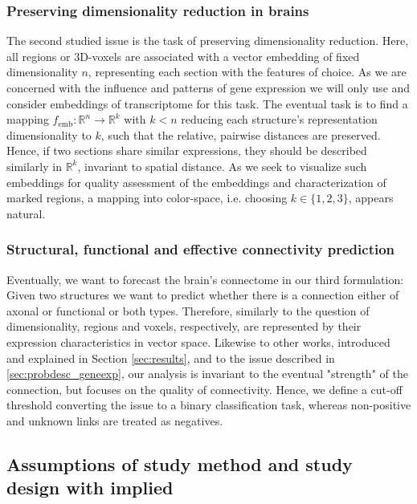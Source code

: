 \documentclass[]{article}
\begin{document}
\subsubsection{Preserving dimensionality reduction in brains}
\label{sec:probdesc_dimpres}
The second studied issue is the task of preserving dimensionality reduction. Here, all regions or 3D-voxels are associated with a vector embedding of fixed dimensionality $n$, representing each section with the features of choice. As we are concerned with the influence and patterns of gene expression we will only use and consider embeddings of transcriptome for this task. The eventual task is to find a mapping $f_{\text{emb}}:\mathbb{R}^n \rightarrow \mathbb{R}^k$ with $k<n$ reducing each structure's representation dimensionality to $k$, such that the relative, pairwise distances are preserved. Hence, if two sections share similar expressions, they should be described similarly in $\mathbb{R}^k$, invariant to spatial distance. As we seek to visualize such embeddings for quality assessment of the embeddings and characterization of marked regions, a mapping into color-space, i.e. choosing $k\in\{1,2,3\}$, appears natural.

\subsubsection{Structural, functional and effective connectivity prediction}
\label{sec:probdesc_connpred}
Eventually, we want to forecast the brain's connectome in our third formulation: Given two structures we want to predict whether there is a connection either of axonal or functional or both types. Therefore, similarly to the question of dimensionality, regions and voxels, respectively, are represented by their expression characteristics in vector space. Likewise to other works, introduced and explained in Section \ref{sec:results}, and to the issue described in \ref{sec:probdesc_geneexp}, our analysis is invariant to the eventual "strength" of the connection, but focuses on the quality of connectivity. Hence, we define a cut-off threshold converting the issue to a binary classification task, whereas non-positive and unknown links are treated as negatives.


\subsection*{Assumptions of study method and study design with implied }
\end{document}
